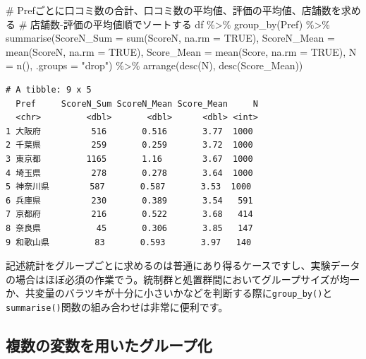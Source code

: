 \documentclass[
  a4paper,
  pandoc,
  ja=standard,
  jafont=haranoaji]{bxjsbook}
\newenvironment{Shaded}{\begin{snugshade}}{\end{snugshade}}
\newcommand{\AttributeTok}[1]{\textcolor[rgb]{0.00,0.48,0.65}{#1}}
\newcommand{\CommentTok}[1]{\textcolor[rgb]{0.37,0.37,0.37}{#1}}
\newcommand{\ConstantTok}[1]{\textcolor[rgb]{0.56,0.35,0.01}{#1}}
\newcommand{\FunctionTok}[1]{\textcolor[rgb]{0.28,0.35,0.67}{#1}}
\newcommand{\NormalTok}[1]{\textcolor[rgb]{0.00,0.48,0.65}{#1}}
\newcommand{\SpecialCharTok}[1]{\textcolor[rgb]{0.37,0.37,0.37}{#1}}
\newcommand{\StringTok}[1]{\textcolor[rgb]{0.13,0.47,0.30}{#1}}
\begin{document}
\begin{Shaded}
\begin{Highlighting}[numbers=left,,]
\CommentTok{\# Prefごとに口コミ数の合計、口コミ数の平均値、評価の平均値、店舗数を求める}
\CommentTok{\# 店舗数{-}評価の平均値順でソートする}
\NormalTok{df }\SpecialCharTok{\%\textgreater{}\%}
  \FunctionTok{group\_by}\NormalTok{(Pref) }\SpecialCharTok{\%\textgreater{}\%}
  \FunctionTok{summarise}\NormalTok{(}\AttributeTok{ScoreN\_Sum  =} \FunctionTok{sum}\NormalTok{(ScoreN,  }\AttributeTok{na.rm =} \ConstantTok{TRUE}\NormalTok{),}
            \AttributeTok{ScoreN\_Mean =} \FunctionTok{mean}\NormalTok{(ScoreN, }\AttributeTok{na.rm =} \ConstantTok{TRUE}\NormalTok{),}
            \AttributeTok{Score\_Mean  =} \FunctionTok{mean}\NormalTok{(Score,  }\AttributeTok{na.rm =} \ConstantTok{TRUE}\NormalTok{),}
            \AttributeTok{N           =} \FunctionTok{n}\NormalTok{(),}
            \AttributeTok{.groups     =} \StringTok{"drop"}\NormalTok{) }\SpecialCharTok{\%\textgreater{}\%}
  \FunctionTok{arrange}\NormalTok{(}\FunctionTok{desc}\NormalTok{(N), }\FunctionTok{desc}\NormalTok{(Score\_Mean))}
\end{Highlighting}
\end{Shaded}

\begin{verbatim}
# A tibble: 9 x 5
  Pref     ScoreN_Sum ScoreN_Mean Score_Mean     N
  <chr>         <dbl>       <dbl>      <dbl> <int>
1 大阪府          516       0.516       3.77  1000
2 千葉県          259       0.259       3.72  1000
3 東京都         1165       1.16        3.67  1000
4 埼玉県          278       0.278       3.64  1000
5 神奈川県        587       0.587       3.53  1000
6 兵庫県          230       0.389       3.54   591
7 京都府          216       0.522       3.68   414
8 奈良県           45       0.306       3.85   147
9 和歌山県         83       0.593       3.97   140
\end{verbatim}

記述統計をグループごとに求めるのは普通にあり得るケースですし、実験データの場合はほぼ必須の作業でう。統制群と処置群間においてグループサイズが均一か、共変量のバラツキが十分に小さいかなどを判断する際に\texttt{group\_by()}と\texttt{summarise()}関数の組み合わせは非常に便利です。

\hypertarget{ux8907ux6570ux306eux5909ux6570ux3092ux7528ux3044ux305fux30b0ux30ebux30fcux30d7ux5316}{%
\subsection{複数の変数を用いたグループ化}\label{ux8907ux6570ux306eux5909ux6570ux3092ux7528ux3044ux305fux30b0ux30ebux30fcux30d7ux5316}}
\end{document}

